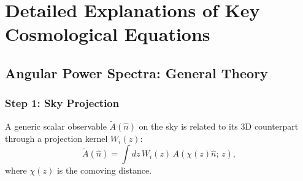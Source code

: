 \section{Detailed Explanations of Key Cosmological Equations}

\subsection{Angular Power Spectra: General Theory}

\subsubsection{Step 1: Sky Projection}

A generic scalar observable $\tilde{A}(\hat{n})$ on the sky is related to its 3D
counterpart through a projection kernel $W_i(z)$:
\begin{equation}
    \tilde{A}(\hat{n}) = \int dz\, W_i(z)\, A(\chi(z)\hat{n};\, z),
    \label{eq:projection}
\end{equation}
where $\chi(z)$ is the comoving distance.


